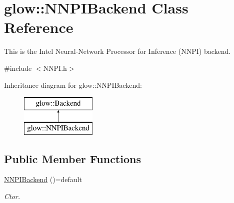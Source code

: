 \hypertarget{classglow_1_1_n_n_p_i_backend}{}\section{glow\+:\+:N\+N\+P\+I\+Backend Class Reference}
\label{classglow_1_1_n_n_p_i_backend}


This is the Intel Neural-\/\+Network Processor for Inference (N\+N\+PI) backend.  




{\ttfamily \#include $<$N\+N\+P\+I.\+h$>$}

Inheritance diagram for glow\+:\+:N\+N\+P\+I\+Backend\+:\begin{figure}[H]
\begin{center}
\leavevmode
\includegraphics[height=2.000000cm]{classglow_1_1_n_n_p_i_backend}
\end{center}
\end{figure}
\subsection*{Public Member Functions}
\begin{DoxyCompactItemize}
\item 
\mbox{\label{classglow_1_1_n_n_p_i_backend_ab83a2560ee01483787b0e25ce9524eb5}} 
\hyperlink{classglow_1_1_n_n_p_i_backend_ab83a2560ee01483787b0e25ce9524eb5}{N\+N\+P\+I\+Backend} ()=default
\begin{DoxyCompactList}\small\item\em Ctor. \end{DoxyCompactList}\end{DoxyCompactItemize}
